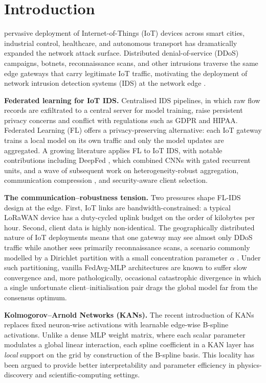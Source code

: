 \section{Introduction}\label{sec:intro}

 pervasive deployment of Internet-of-Things (IoT) devices across smart cities, industrial control, healthcare, and autonomous transport has dramatically expanded the network attack surface. Distributed denial-of-service (DDoS) campaigns, botnets, reconnaissance scans, and other intrusions traverse the same edge gateways that carry legitimate IoT traffic, motivating the deployment of network intrusion detection systems (IDS) at the network edge \cite{nguyen2021fl-iot-survey}.

\textbf{Federated learning for IoT IDS.} Centralised IDS pipelines, in which raw flow records are exfiltrated to a central server for model training, raise persistent privacy concerns and conflict with regulations such as GDPR and HIPAA. Federated Learning (FL) \cite{mcmahan2017fedavg} offers a privacy-preserving alternative: each IoT gateway trains a local model on its own traffic and only the model updates are aggregated. A growing literature applies FL to IoT IDS, with notable contributions including DeepFed \cite{li2020deepfed}, which combined CNNs with gated recurrent units, and a wave of subsequent work on heterogeneity-robust aggregation, communication compression \cite{sattler2019sparse,reisizadeh2020fedpaq,aji2017topk}, and security-aware client selection.

\textbf{The communication--robustness tension.} Two pressures shape FL-IDS design at the edge. First, IoT links are bandwidth-constrained: a typical LoRaWAN device has a duty-cycled uplink budget on the order of kilobytes per hour. Second, client data is highly non-identical. The geographically distributed nature of IoT deployments means that one gateway may see almost only DDoS traffic while another sees primarily reconnaissance scans, a scenario commonly modelled by a Dirichlet partition with a small concentration parameter $\alpha$ \cite{hsu2019measuring}. Under such partitioning, vanilla FedAvg-MLP architectures are known to suffer slow convergence and, more pathologically, occasional catastrophic divergence in which a single unfortunate client--initialisation pair drags the global model far from the consensus optimum.

\textbf{Kolmogorov--Arnold Networks (KANs).} The recent introduction of KANs \cite{liu2024kan} replaces fixed neuron-wise activations with learnable edge-wise B-spline activations. Unlike a dense MLP weight matrix, where each scalar parameter modulates a global linear interaction, each spline coefficient in a KAN layer has \emph{local} support on the grid by construction of the B-spline basis. This locality has been argued to provide better interpretability and parameter efficiency in physics-discovery and scientific-computing settings.


